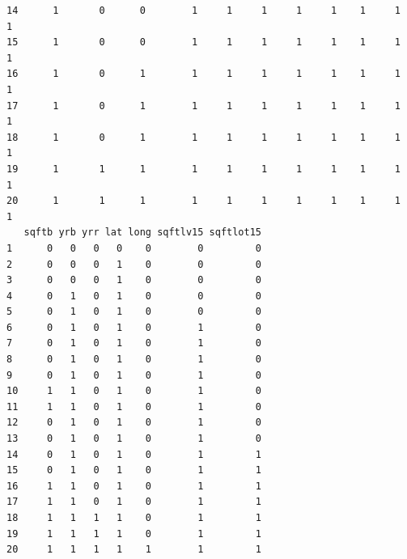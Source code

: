 \documentclass{article}%
\begin{document}
\begin{verbatim}
14      1       0      0        1     1     1     1     1    1     1     1
15      1       0      0        1     1     1     1     1    1     1     1
16      1       0      1        1     1     1     1     1    1     1     1
17      1       0      1        1     1     1     1     1    1     1     1
18      1       0      1        1     1     1     1     1    1     1     1
19      1       1      1        1     1     1     1     1    1     1     1
20      1       1      1        1     1     1     1     1    1     1     1
   sqftb yrb yrr lat long sqftlv15 sqftlot15
1      0   0   0   0    0        0         0
2      0   0   0   1    0        0         0
3      0   0   0   1    0        0         0
4      0   1   0   1    0        0         0
5      0   1   0   1    0        0         0
6      0   1   0   1    0        1         0
7      0   1   0   1    0        1         0
8      0   1   0   1    0        1         0
9      0   1   0   1    0        1         0
10     1   1   0   1    0        1         0
11     1   1   0   1    0        1         0
12     0   1   0   1    0        1         0
13     0   1   0   1    0        1         0
14     0   1   0   1    0        1         1
15     0   1   0   1    0        1         1
16     1   1   0   1    0        1         1
17     1   1   0   1    0        1         1
18     1   1   1   1    0        1         1
19     1   1   1   1    0        1         1
20     1   1   1   1    1        1         1
\end{verbatim}
\end{document}
